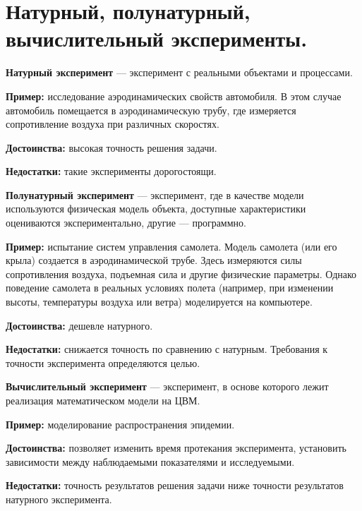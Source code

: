\section{Натурный, полунатурный, вычислительный эксперименты.}

\textbf{Натурный эксперимент} — эксперимент с реальными объектами и процессами.

\textbf{Пример:} исследование аэродинамических свойств автомобиля. В этом случае автомобиль помещается в аэродинамическую трубу, где измеряется сопротивление воздуха при различных скоростях.

\textbf{Достоинства:} высокая точность решения задачи.

\textbf{Недостатки:} такие эксперименты дорогостоящи.

\textbf{Полунатурный эксперимент} — эксперимент, где в качестве модели используются физическая модель объекта, доступные характеристики оцениваются экспериментально, другие — программно.

\textbf{Пример:} испытание систем управления самолета. Модель самолета (или его крыла) создается в аэродинамической трубе. Здесь измеряются силы сопротивления воздуха, подъемная сила и другие физические параметры. Однако поведение самолета в реальных условиях полета (например, при изменении высоты, температуры воздуха или ветра) моделируется на компьютере.

\textbf{Достоинства:} дешевле натурного.

\textbf{Недостатки:} снижается точность по сравнению с натурным. Требования к точности эксперимента определяются целью.

\textbf{Вычислительный эксперимент} — эксперимент, в основе которого лежит реализация математическом модели на ЦВМ.

\textbf{Пример:} моделирование распространения эпидемии.

\textbf{Достоинства:} позволяет изменить время протекания эксперимента, установить зависимости между наблюдаемыми показателями и исследуемыми.

\textbf{Недостатки:} точность результатов решения задачи ниже точности результатов натурного эксперимента.

\clearpage

